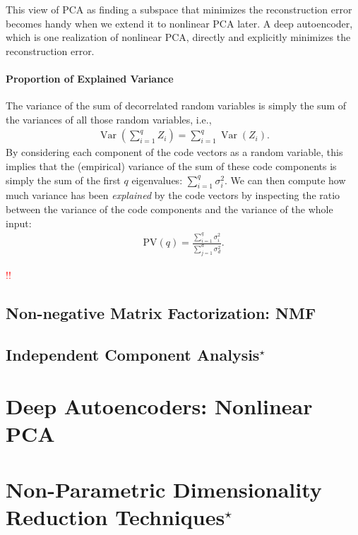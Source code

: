 \documentclass{report}
\newcommand{\var}[0]{\operatorname{Var}}
\newcommand{\todo}[1]{{\Large\textcolor{red}{#1}}}
\begin{document}
This view of PCA as finding a subspace that minimizes the reconstruction error
becomes handy when we extend it to nonlinear PCA later. A deep autoencoder,
which is one realization of nonlinear PCA, directly and explicitly minimizes the
reconstruction error.

\paragraph{Proportion of Explained Variance}

The variance of the sum of decorrelated random variables is simply the sum of
the variances of all those random variables, i.e.,
\begin{align*}
    \var(\sum_{i=1}^q Z_i) = \sum_{i=1}^q \var(Z_i).
\end{align*}
By considering each component of the code vectors as a random variable, this
implies that the (empirical) variance of the sum of these code components is
simply the sum of the first $q$ eigenvalues: $\sum_{i=1}^q \sigma_i^2$. We can
then compute how much variance has been {\it explained} by the code vectors by
inspecting the ratio between the variance of the code components and the
variance of the whole input:
\begin{align*}
    \text{PV}(q) = \frac{
        \sum_{i=1}^q \sigma_i^2
    }{
        \sum_{j=1}^d \sigma_d^2
    }.
\end{align*}

\todo{!!}


\subsection{Non-negative Matrix Factorization: NMF}




\subsection{Independent Component Analysis$^\star$}


\section{Deep Autoencoders: Nonlinear PCA}




\section{Non-Parametric Dimensionality Reduction Techniques$^\star$}
\end{document}
